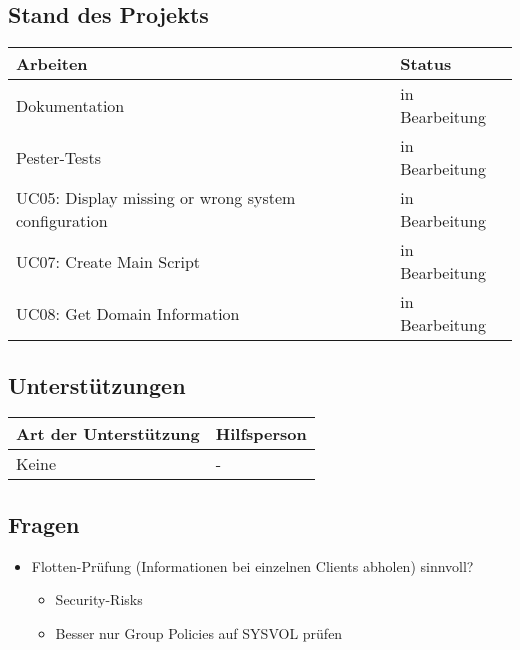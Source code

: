 \subsection*{Stand des Projekts}
\begin{table}[H]
    \centering
    \begin{tabular}{p{12cm} p{4cm}}
        \textbf{Arbeiten} & \textbf{Status} \\ \hline
        Dokumentation & in Bearbeitung \\ \hline
        Pester-Tests & in Bearbeitung \\ \hline
        UC05: Display missing or wrong system configuration & in Bearbeitung \\ \hline
        UC07: Create Main Script & in Bearbeitung \\ \hline
        UC08: Get Domain Information & in Bearbeitung \\ \hline
    \end{tabular}
\end{table}

\vspace{1cm}

\subsection*{Unterstützungen}
\begin{table}[H]
    \centering
    \begin{tabular}{p{12cm} p{4cm}}
        \textbf{Art der Unterstützung} & \textbf{Hilfsperson} \\ \hline
        Keine & - \\ \hline
    \end{tabular}
\end{table}

\vspace{1cm}

\subsection*{Fragen}
\begin{itemize}
    \item Flotten-Prüfung (Informationen bei einzelnen Clients abholen) sinnvoll?
    \begin{itemize}
        \item Security-Risks
        \item Besser nur Group Policies auf SYSVOL prüfen
    \end{itemize}
\end{itemize}

